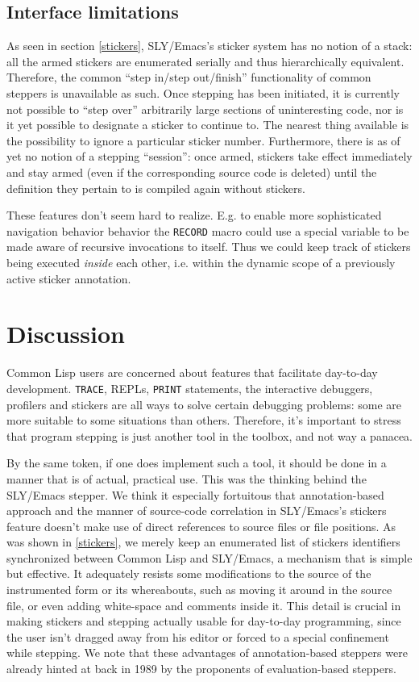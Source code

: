 \documentclass[sigconf]{acmart}
\begin{document}
\subsection{Interface limitations}

As seen in section \ref{stickers}, SLY/Emacs's sticker system has no
notion of a stack: all the armed stickers are enumerated serially and
thus hierarchically equivalent.  Therefore, the common ``step in/step
out/finish'' functionality of common steppers is unavailable as such.
Once stepping has been initiated, it is currently not possible to
``step over'' arbitrarily large sections of uninteresting code, nor is
it yet possible to designate a sticker to continue to.  The nearest
thing available is the possibility to ignore a particular sticker
number.  Furthermore, there is as of yet no notion of a stepping
``session'': once armed, stickers take effect immediately and stay
armed (even if the corresponding source code is deleted) until the
definition they pertain to is compiled again without stickers.

These features don't seem hard to realize.  E.g. to enable more
sophisticated navigation behavior behavior the \texttt{RECORD} macro
could use a special variable to be made aware of recursive invocations
to itself.  Thus we could keep track of stickers being executed
\emph{inside} each other, i.e. within the dynamic scope of a
previously active sticker annotation.

\section{Discussion}

Common Lisp users are concerned about features that facilitate
day-to-day development.  \texttt{TRACE}, REPLs, \texttt{PRINT}
statements, the interactive debuggers, profilers and stickers are all
ways to solve certain debugging problems: some are more suitable to
some situations than others.  Therefore, it's important to stress that
program stepping is just another tool in the toolbox, and not way a
panacea.

By the same token, if one does implement such a tool, it should be
done in a manner that is of actual, practical use.  This was the
thinking behind the SLY/Emacs stepper.  We think it especially
fortuitous that annotation-based approach and the manner of
source-code correlation in SLY/Emacs's stickers feature doesn't make
use of direct references to source files or file positions.  As was
shown in \ref{stickers}, we merely keep an enumerated list of stickers
identifiers synchronized between Common Lisp and SLY/Emacs, a
mechanism that is simple but effective.  It adequately resists some
modifications to the source of the instrumented form or its
whereabouts, such as moving it around in the source file, or even
adding white-space and comments inside it.  This detail is crucial in
making stickers and stepping actually usable for day-to-day
programming, since the user isn't dragged away from his editor or
forced to a special confinement while stepping.  We note that these
advantages of annotation-based steppers were already hinted at back in
1989 by the proponents of evaluation-based steppers\cite[l.41,
l.42]{evaluation-based}.
\end{document}
